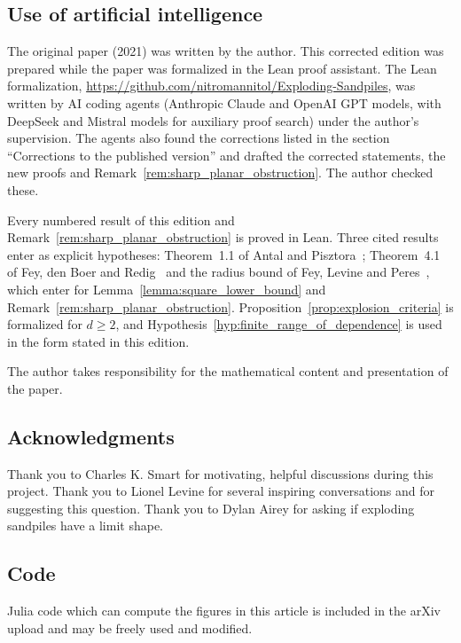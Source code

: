 \documentclass[12pt]{amsart}
\begin{document}
\subsection*{Use of artificial intelligence}
The original paper (2021) was written by the author. This corrected edition was prepared while the paper was formalized in the Lean proof assistant. The Lean formalization, \url{https://github.com/nitromannitol/Exploding-Sandpiles}, was written by AI coding agents (Anthropic Claude and OpenAI GPT models, with DeepSeek and Mistral models for auxiliary proof search) under the author's supervision. The agents also found the corrections listed in the section ``Corrections to the published version'' and drafted the corrected statements, the new proofs and Remark~\ref{rem:sharp_planar_obstruction}. The author checked these.

Every numbered result of this edition and Remark~\ref{rem:sharp_planar_obstruction} is proved in Lean. Three cited results enter as explicit hypotheses: Theorem~1.1 of Antal and Pisztora~\cite{antal1996chemical}; Theorem~4.1 of Fey, den Boer and Redig~\cite{fey2008limiting} and the radius bound of Fey, Levine and Peres~\cite{fey2010growth}, which enter for Lemma~\ref{lemma:square_lower_bound} and Remark~\ref{rem:sharp_planar_obstruction}. Proposition~\ref{prop:explosion_criteria} is formalized for $d\geq2$, and Hypothesis~\ref{hyp:finite_range_of_dependence} is used in the form stated in this edition.

The author takes responsibility for the mathematical content and presentation of the paper.

\subsection*{Acknowledgments}
Thank you to Charles K. Smart for motivating, helpful discussions 
during this project. Thank you to Lionel Levine for several
inspiring conversations and for suggesting this question.  Thank you to Dylan Airey for asking if exploding sandpiles have a limit shape. 



\subsection*{Code}
Julia code which can compute the figures in this article is included in the arXiv upload and may be freely used
and modified.
\end{document}
